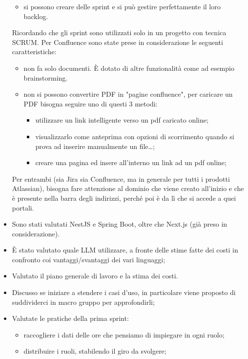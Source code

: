 \begin{itemize}
\begin{itemize}
    \item si possono creare delle sprint e si può gestire perfettamente il loro backlog.
    \end{itemize}
    Ricordando che gli sprint sono utilizzati solo in un progetto con tecnica SCRUM.
    Per Confluence sono state prese in considerazione le seguenti caratteristiche:
    \begin{itemize}
        \item non fa solo documenti. È dotato di altre funzionalità come ad esempio brainstorming.
        \item non si possono convertire PDF in "pagine confluence", per caricare un PDF bisogna seguire uno di questi 3  metodi:
        \begin{itemize}
            \item utilizzare un link intelligente verso un pdf caricato online;
            \item visualizzarlo come anteprima con opzioni di scorrimento quando si prova ad inserire manualmente un file\dots;
            \item creare una pagina ed insere all'interno un link ad un pdf online;
        \end{itemize}
    \end{itemize}
    Per entrambi (sia Jira sia Confluence, ma in generale per tutti i prodotti Atlassian), bisogna fare attenzione al dominio che viene creato all'inizio e che è presente nella barra degli indirizzi, perché poi è da lì che si accede a quei portali.
    \item Sono stati valutati NestJS e Spring Boot, oltre che Next.js (già preso in considerazione).
    \item È stato valutato quale LLM utilizzare, a fronte delle stime fatte dei costi in confronto coi vantaggi/svantaggi dei vari linguaggi;
    \item Valutato il piano generale di lavoro e la stima dei costi.
    \item Discusso se iniziare a stendere i casi d'uso, in particolare viene proposto di suddividerci in macro gruppo per approfondirli;
    \item Valutate le pratiche della prima sprint:
    \begin{itemize}
        \item raccogliere i dati delle ore che pensiamo di impiegare in ogni ruolo;
        \item distribuire i ruoli, stabilendo il giro da svolgere;
    \end{itemize}

\end{itemize}
